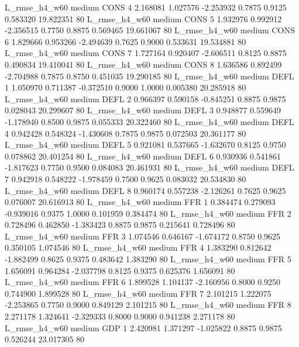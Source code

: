  L_rmse_h4_w60     medium     CONS                 4  2.168081 1.027576 -2.253932 0.7875 0.9125  0.583320   19.822351 80
 L_rmse_h4_w60     medium     CONS                 5  1.932976 0.992912 -2.356515 0.7750 0.8875  0.569465   19.661067 80
 L_rmse_h4_w60     medium     CONS                 6  1.829666 0.953266 -2.494639 0.7625 0.9000  0.533631   19.534881 80
 L_rmse_h4_w60     medium     CONS                 7  1.727164 0.920407 -2.606511 0.8125 0.8875  0.490834   19.410041 80
 L_rmse_h4_w60     medium     CONS                 8  1.636586 0.892499 -2.704988 0.7875 0.8750  0.451035   19.290185 80
 L_rmse_h4_w60     medium     DEFL                 1  1.050970 0.711387 -0.372510 0.9000 1.0000  0.005380   20.285918 80
 L_rmse_h4_w60     medium     DEFL                 2  0.966397 0.590158 -0.845251 0.8875 0.9875  0.028043   20.299607 80
 L_rmse_h4_w60     medium     DEFL                 3  0.948877 0.559649 -1.178940 0.8500 0.9875  0.055333   20.322460 80
 L_rmse_h4_w60     medium     DEFL                 4  0.942428 0.548324 -1.430608 0.7875 0.9875  0.072503   20.361177 80
 L_rmse_h4_w60     medium     DEFL                 5  0.921081 0.537665 -1.632670 0.8125 0.9750  0.078862   20.401254 80
 L_rmse_h4_w60     medium     DEFL                 6  0.930936 0.541861 -1.817623 0.7750 0.9500  0.084083   20.461931 80
 L_rmse_h4_w60     medium     DEFL                 7  0.942918 0.548222 -1.978459 0.7500 0.9625  0.083032   20.534830 80
 L_rmse_h4_w60     medium     DEFL                 8  0.960174 0.557238 -2.126261 0.7625 0.9625  0.076007   20.616913 80
 L_rmse_h4_w60     medium      FFR                 1  0.384474 0.279093 -0.939016 0.9375 1.0000  0.101959    0.384474 80
 L_rmse_h4_w60     medium      FFR                 2  0.728496 0.462850 -1.383423 0.8875 0.9875  0.215641    0.728496 80
 L_rmse_h4_w60     medium      FFR                 3  1.074546 0.646167 -1.674172 0.8750 0.9625  0.350105    1.074546 80
 L_rmse_h4_w60     medium      FFR                 4  1.383290 0.812642 -1.882499 0.8625 0.9375  0.483642    1.383290 80
 L_rmse_h4_w60     medium      FFR                 5  1.656091 0.964284 -2.037798 0.8125 0.9375  0.625376    1.656091 80
 L_rmse_h4_w60     medium      FFR                 6  1.899528 1.104137 -2.160956 0.8000 0.9250  0.744900    1.899528 80
 L_rmse_h4_w60     medium      FFR                 7  2.101215 1.222075 -2.253865 0.7750 0.9000  0.849129    2.101215 80
 L_rmse_h4_w60     medium      FFR                 8  2.271178 1.324641 -2.329333 0.8000 0.9000  0.941238    2.271178 80
 L_rmse_h4_w60     medium      GDP                 1  2.420981 1.371297 -1.025822 0.8875 0.9875  0.526244   23.017305 80
